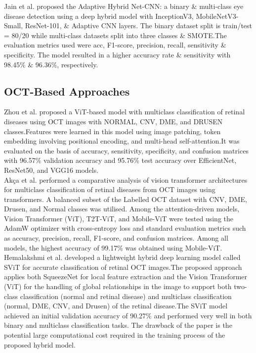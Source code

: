 \documentclass[conference,9pt]{IEEEtran}
\begin{document}
Jain et al. \cite{16} proposed the Adaptive Hybrid Net-CNN: a binary \& multi-class eye disease detection using a deep hybrid model with InceptionV3, MobileNetV3-Small, ResNet-101, \& Adaptive CNN layers. The binary dataset split is train/test = 80/20 while multi-class datasets split into three classes \& SMOTE.The evaluation metrics used were acc, F1-score, precision, recall, sensitivity \& specificity. The model resulted in a higher accuracy rate \& sensitivity with 98.45\% \& 96.36\%, respectively.\\

\subsection{\textbf{OCT-Based Approaches}}
Zhou et al. \cite{3} proposed a ViT-based model with multiclass classification of retinal diseases using OCT images with NORMAL, CNV, DME, and DRUSEN classes.Features were learned in this model using image patching, token embedding involving positional encoding, and multi-head self-attention.It was evaluated on the basis of accuracy, sensitivity, specificity, and confusion matrices with 96.57\% validation accuracy and 95.76\% test accuracy over EfficientNet, ResNet50, and VGG16 models.\\

Akça et al.\cite{4} performed a comparative analysis of vision transformer architectures for multiclass classification of retinal diseases from OCT images using transformers.
A balanced subset of the Labelled OCT dataset with CNV, DME, Drusen, and Normal classes was utilised. Among the attention-driven models, Vision Transformer (ViT), T2T-ViT, and Mobile-ViT were tested using the AdamW optimizer with cross-entropy loss and standard evaluation metrics such as accuracy, precision, recall, F1-score, and confusion matrices. Among all models, the highest accuracy of 99.17\% was obtained using Mobile-ViT.\\

Hemalakshmi et al. \cite{14} developed a lightweight hybrid deep learning model called SViT for accurate classification of retinal OCT images.The proposed approach applies both SqueezeNet for local feature extraction and the Vision Transformer (ViT) for the handling of global relationships in the image to support both two-class classification (normal and retinal disease) and multiclass classification (normal, DME, CNV, and Drusen) of the retinal disease.The SViT model achieved an initial validation accuracy of 90.27\% and performed very well in both binary and multiclass classification tasks. The drawback of the paper is the potential large computational cost required in the training process of the proposed hybrid model.\\
\end{document}
